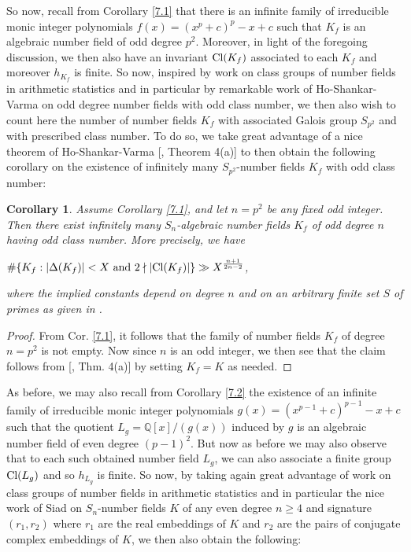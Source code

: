 \documentclass{article}
\theoremstyle{plain}
\newtheorem{cor}[thm]{Corollary}
\theoremstyle{definition}
\begin{document}
So now, recall from Corollary \ref{7.1} that there is an infinite family of irreducible monic integer polynomials $f(x) = (x^p+c)^p-x+c$ such that $K_{f}$ is an algebraic number field of odd degree $p^2$. Moreover, in light of the foregoing discussion, we then also have an invariant $\textnormal{Cl}(K_{f})$ associated to each $K_{f}$ and moreover  $h_{K_{f}}$ is finite. So now, inspired by work on class groups of number fields in arithmetic statistics and in particular by remarkable work of Ho-Shankar-Varma \cite{ho} on odd degree number fields with odd class number, we then also wish to count here the number of number fields $K_{f}$ with associated Galois group $S_{p^2}$ and with prescribed class number. To do so, we take great advantage of a nice theorem of Ho-Shankar-Varma [\cite{ho}, Theorem 4(a)] to then obtain the following corollary on the existence of infinitely many $S_{p^2}$-number fields $K_{f}$ with odd class number:

\begin{cor}
Assume Corollary \ref{7.1}, and let $n=p^2$ be any fixed odd integer. Then there exist infinitely many $S_{n}$-algebraic number fields $K_{f}$ of odd degree $n$  having odd class number.  More precisely, we have 
\begin{center}
$\#\{ K_{f} : |\Delta(K_{f})| < X \textnormal{ and } 2\nmid |\textnormal{Cl}(K_{f})|\}\gg X^{\frac{n + 1}{2n -2}}$,
\end{center} where the implied constants depend on degree $n$ and on an arbitrary finite set $S$ of primes as given in \textnormal{\cite{ho}}.
\end{cor}

\begin{proof}
From Cor. \ref{7.1}, it follows that the family of number fields $K_{f}$ of degree $n = p^2$ is not empty. Now since $n$ is an odd integer, we then see that the claim follows from [\cite{ho}, Thm. 4(a)] by setting $K_{f}=K$ as needed.
\end{proof}

As before, we may also recall from Corollary \ref{7.2} the existence of an infinite family of irreducible monic integer polynomials $g(x) = (x^{p-1}+c)^{p-1}-x+c$ such that the quotient $L_{g} = \mathbb{Q}[x]\slash (g(x))$ induced by $g$ is an algebraic number field of even degree $(p-1)^2$. But now as before we may also observe that to each such obtained number field $L_{g}$, we can also associate a finite group $\textnormal{Cl}(L_{g})$ and so $h_{L_{g}}$ is finite. So now, by taking again great advantage of work on class groups of number fields in arithmetic statistics and in particular the nice work of Siad \cite{Sia} on $S_{n}$-number fields $K$ of any even degree $n\geq 4$ and signature $(r_{1}, r_{2})$ where $r_{1}$ are the real embeddings of $K$  and $r_{2}$ are the pairs of conjugate complex embeddings of $K$, we then also obtain the following: 
\end{document}
